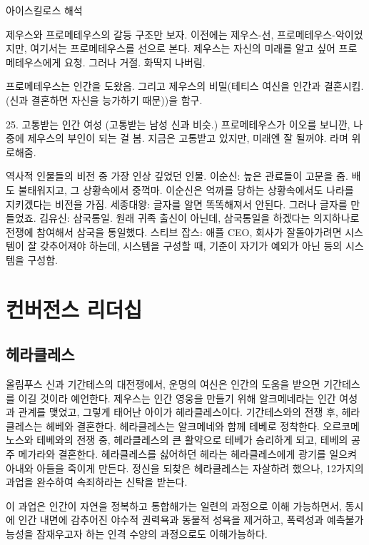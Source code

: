 아이스킬로스 해석

제우스와 프로메테우스의 갈등 구조만 보자. 이전에는 제우스-선, 프로메테우스-악이었지만,
여기서는 프로메테우스를 선으로 본다. 제우스는 자신의 미래를 알고 싶어 프로메테우스에게 요청. 그러나 거절.
화딱지 나버림. 

프로메테우스는 인간을 도왔음. 그리고 제우스의 비밀(테티스 여신을 인간과
결혼시킴. (신과 결혼하면 자신을 능가하기 때문))을 함구.

25. 고통받는 인간 여성 (고통받는 남성 신과 비슷.) 
프로메테우스가 이오를 보니깐, 나중에 제우스의 부인이 되는 걸 봄.
지금은 고통받고 있지만, 미래엔 잘 될꺼야. 라며 위로해줌.


역사적 인물들의 비전 중 가장 인상 깊었던 인물.
이순신: 높은 관료들이 고문을 줌. 배도 불태워지고, 그 상황속에서 중꺽마. 
이순신은 억까를 당하는 상황속에서도 나라를 지키겠다는 비전을 가짐.
세종대왕: 글자를 알면 똑똑해져서 안된다. 그러나 글자를 만들었죠.
김유신: 삼국통일. 원래 귀족 출신이 아닌데, 삼국통일을 하겠다는 의지하나로 전쟁에 참여해서 삼국을 통일했다.
스티브 잡스: 애플 CEO, 회사가 잘돌아가려면 시스템이 잘 갖추어져야 하는데, 시스템을 구성할 때, 기준이
자기가 예외가 아닌 등의 시스템을 구성함.

\section{컨버전스 리더십}

\subsection{헤라클레스}

올림푸스 신과 기간테스의 대전쟁에서, 운명의 여신은 인간의 도움을 받으면
기간테스를 이길 것이라 예언한다. 제우스는 인간 영웅을 만들기 위해 알크메네라는
인간 여성과 관계를 맺었고, 그렇게 태어난 아이가 헤라클레스이다. 기간테스와의
전쟁 후, 헤라클레스는 헤베와 결혼한다. 헤라클레스는 알크메네와 함께 테베로
정착한다. 오르코메노스와 테베와의 전쟁 중, 헤라클레스의 큰 활약으로 테베가
승리하게 되고, 테베의 공주 메가라와 결혼한다. 헤라클레스를 싫어하던 헤라는
헤라클레스에게 광기를 일으켜 아내와 아들을 죽이게 만든다. 정신을 되찾은
헤라클레스는 자살하려 했으나, 12가지의 과업을 완수하여 속죄하라는 신탁을 받는다.

이 과업은 인간이 자연을 정복하고 통합해가는 일련의 과정으로 이해 가능하면서,
동시에 인간 내면에 감추어진 야수적 권력욕과 동물적 성욕을 제거하고, 폭력성과
예측불가능성을 잠재우고자 하는 인격 수양의 과정으로도 이해가능하다.

